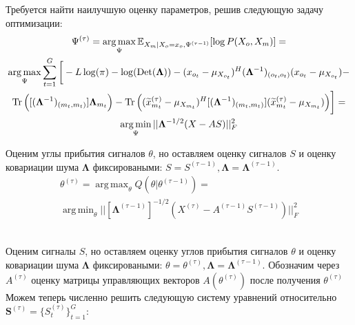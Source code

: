 \documentclass[11pt]{article}
\newcommand{\Expect}{\mathbb{E}}
\DeclareMathOperator*{\argmax}{arg\,max}
\DeclareMathOperator*{\argmin}{arg\,min}
\DeclareMathOperator{\Det}{Det}
\begin{document}
\begin{center}
\fontsize{14}{18}\selectfont {}
\end{center}
Требуется найти наилучшую оценку параметров, решив следующую задачу оптимизации:
\begin{equation*}
\begin{gathered}
\Psi^{(\tau)}=\argmax_{\Psi} \Expect_{X_m|X_o=x_o, \Psi^{(\tau-1)}}[\log P(X_o, X_m)] =\\
\argmax_{\Psi}  \sum_{t=1}^G \bigg[ -L \log(\pi) - \log (\Det(\mathbf{\Lambda})) - (x_{o_t}-\mu_{X_{o_t}})^H (\mathbf{\Lambda}^{-1})_{(o_t, o_t)}(x_{o_t}-\mu_{X_{o_t}}) -  \\ \Tr \Big( [(\mathbf{\Lambda}^{-1})_{(m_t, m_t)}]\mathbf{\Lambda}_{m_t} \Big) - \Tr \Big((\widetilde{x}_{m_t}^{(\tau)} - \mu_{X_{m_t}})^H[(\mathbf{\Lambda}^{-1})_{(m_t, m_t)}](\widetilde{x}_{m_t}^{(\tau)} - \mu_{X_{m_t}}) \Big)  \bigg] = \\
\argmin_{\Psi} ||\mathbf{\Lambda}^{-1/2}(X-AS)||_F^2
\end{gathered}
\end{equation*}
\begin{center}
\fontsize{14}{18}\selectfont {}
\end{center}
Оценим углы прибытия сигналов $\theta$, но оставляем оценку сигналов $S$ и оценку ковариации шума $\mathbf{\Lambda}$ фиксироваными: $S = S^{(\tau-1)}, \mathbf{\Lambda}=\mathbf{\Lambda}^{(\tau-1)}$.
\begin{equation*}
\begin{gathered}
\theta^{(\tau)}= \argmax_{\theta} Q(\theta | \theta^{(\tau-1)}) = \\
\argmin_{\theta} ||[\mathbf{\Lambda}^{(\tau-1)}]^{-1/2}(X^{(\tau)}-A^{(\tau-1)}S^{(\tau-1)})||_F^2
\end{gathered}
\end{equation*}
\\
\begin{center}
\fontsize{14}{18}\selectfont {}
\end{center}
Оценим сигналы $S$, но оставляем оценку углов прибытия сигналов $\theta$ и оценку ковариации шума $\mathbf{\Lambda}$ фиксироваными: $\theta = \theta^{(\tau)}, \mathbf{\Lambda}=\mathbf{\Lambda}^{(\tau-1)}$. Обозначим через $A^{(\tau)}$ оценку матрицы управляющих векторов $A(\theta^{(\tau)})$ после получения $\theta^{(\tau)}$
Можем теперь численно решить следующую систему уравнений относительно $\mathbf{S}^{(\tau)}=\{S_t^{(\tau)}\}_{t=1}^G$:
\end{document}
